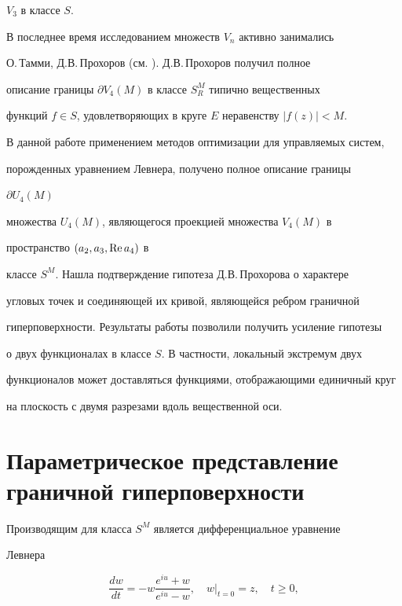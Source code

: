 $V_3$ в классе $S$.





В последнее время исследованием множеств $V_n$ активно занимались


О.\,Тамми, Д.В.\,Прохоров (см. \cite{3}). Д.В.\,Прохоров получил полное


описание границы $\partial V_4(M)$ в классе $S^M_R$ типично вещественных


функций $f\in S$, удовлетворяющих в круге $E$ неравенству $|f(z)|<M$.





В данной работе применением методов оптимизации для управляемых систем,


порожденных уравнением Левнера, получено полное описание границы


$\partial U_4(M)$


множества $U_4(M)$, являющегося проекцией множества $V_4(M)$ в


пространство $(a_2,a_3,\operatorname{Re} a_4)$ в


классе $S^M$. Нашла подтверждение гипотеза Д.В.\,Прохорова о характере


угловых точек и соединяющей их кривой, являющейся ребром граничной


гиперповерхности. Результаты работы позволили получить усиление гипотезы


о двух функционалах в классе $S$. В частности, локальный экстремум двух


функционалов может доставляться функциями, отображающими единичный круг


на плоскость с двумя разрезами вдоль вещественной оси.





\section{Параметрическое представление граничной гиперповерхности}





Производящим для класса $S^M$ является дифференциальное уравнение


Левнера


\begin{equation}


\frac{dw}{dt}=-w\frac{e^{iu}+w}{e^{iu}-w},\quad


w\big|_{t=0}=z,\quad t\ge 0,


\end{equation}


